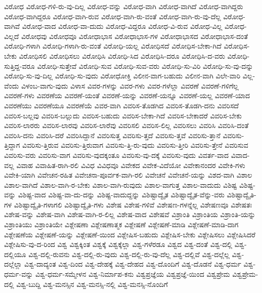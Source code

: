 {ವಿರೋಧ
ವಿರೋಧ-ಗಳಿ-ರು-ವು-ದಿಲ್ಲ
ವಿರೋಧ-ವನ್ನು
ವಿರೋಧ-ವಾಗಿ
ವಿರೋಧ-ವಾಗಿದೆ
ವಿರೋಧ-ವಾಗಿದ್ದರು
ವಿರೋಧ-ವಾಗಿದ್ದರೂ
ವಿರೋಧ-ವಾಗಿ-ರುವ
ವಿರೋಧ-ವಾಗಿ-ರು-ವಂತೆ
ವಿರೋಧ-ವಾಗಿ-ರು-ವು-ದೆಲ್ಲ
ವಿರೋಧ-ವಾಗಿವೆ
ವಿರೋಧ-ವಾದ
ವಿರೋಧ-ವಾ-ದುದು
ವಿರೋಧ-ವಿದ್ದರೂ
ವಿರೋಧ-ವಿ-ರುವ
ವಿರೋಧ-ವಿಲ್ಲ
ವಿರೋಧ-ವಿಲ್ಲದೆ
ವಿರೋಧವು
ವಿರೋಧವೂ
ವಿರೋಧಾಭಾಸ
ವಿರೋಧಾಭಾಸ-ಗಳ
ವಿರೋಧಾಭಾಸದ
ವಿರೋಧಾಭಾಸ-ದಂತೆ
ವಿರೋಧಿ-ಗಳಾಗಿ
ವಿರೋಧಿ-ಗಳಾಗಿ-ರು-ವಂತೆ
ವಿರೋಧಿ-ಯಲ್ಲ
ವಿರೋಧಿಸದೆ
ವಿರೋಧಿಸ-ಬೇಕಾ-ಗಿದೆ
ವಿರೋಧಿಸ-ಬೇಕು
ವಿರೋಧಿಸಲಿ
ವಿರೋಧಿಸಲು
ವಿರೋಧಿಸಿ
ವಿರೋಧಿ-ಸಿದ
ವಿರೋಧಿಸಿ-ದರೂ
ವಿರೋಧಿಸಿ-ದ-ವರು
ವಿರೋಧಿ-ಸುತ್ತಿದ್ದ-ವರೂ
ವಿರೋಧಿ-ಸುತ್ತೇವೆ
ವಿರೋಧಿ-ಸುವ
ವಿರೋಧಿ-ಸುವ-ವರು
ವಿರೋಧಿ-ಸು-ವಿರಿ
ವಿರೋಧಿ-ಸು-ವು-ದನ್ನು
ವಿರೋಧಿ-ಸು-ವು-ದಿಲ್ಲ
ವಿರೋಧಿ-ಸು-ವುದು
ವಿರೋಧೋಕ್ತಿ
ವಿಲೀನ-ವಾಗ-ಬಹುದು
ವಿಲೀನ-ವಾಗಿ
ವಿಲೇ-ವಾರಿ
ವಿಲ್ಲ-ವೆಂದು
ವಿಳಂಬ-ವಾಗು-ವುದು
ವಿಳಾಸ
ವಿವರ-ಗಳನ್ನು
ವಿವರ-ಗಳು
ವಿವರ-ಗಳೆಲ್ಲಾ
ವಿವರಣೆ
ವಿವರಣೆ-ಗಳಿಗೆಲ್ಲ
ವಿವರಣೆ-ಗಳು
ವಿವರಣೆಯ
ವಿವರಣೆ-ಯಂತೆ
ವಿವರಣೆ-ಯನ್ನು
ವಿವರಣೆ-ಯನ್ನೂ
ವಿವರಣೆ-ಯಲ್ಲ
ವಿವರಣೆ-ಯಾದ
ವಿವರಣೆಯು
ವಿವರಣೆಯೂ
ವಿವರಣೆಯೆ
ವಿವರ-ವಾಗಿ
ವಿವರಿಸ-ತೊಡಗಿದ
ವಿವರಿಸ-ತೊಡಗಿ-ದನು
ವಿವರಿಸದೆ
ವಿವರಿಸ-ಬಲ್ಲವು
ವಿವರಿಸ-ಬಲ್ಲುದು
ವಿವರಿಸ-ಬಹುದು
ವಿವರಿಸ-ಬೇಕಾ-ಗಿದೆ
ವಿವರಿಸ-ಬೇಕಾದರೆ
ವಿವರಿಸ-ಬೇಕು
ವಿವರಿಸ-ಲಾರರು
ವಿವರಿಸ-ಲಾರವು
ವಿವರಿಸ-ಲಾರೆವು
ವಿವರಿಸಲಿ
ವಿವರಿಸ-ಲಿಲ್ಲ
ವಿವರಿಸಲು
ವಿವರಿಸಿ
ವಿವರಿಸಿ-ದಂತೆ
ವಿವರಿಸಿ-ದನು
ವಿವರಿಸಿ-ದರೆ
ವಿವರಿಸಿದ್ದಾನೆ
ವಿವರಿಸುತ್ತ
ವಿವರಿಸು-ತ್ತದೆ
ವಿವರಿಸು-ತ್ತವೆ
ವಿವರಿಸು-ತ್ತಾನೆ
ವಿವರಿಸು-ತ್ತಿದ್ದಾಗ
ವಿವರಿಸು-ತ್ತಿರುವ
ವಿವರಿಸು-ತ್ತಿರುವಾಗ
ವಿವರಿಸು-ತ್ತಿ-ರು-ವುದು
ವಿವರಿಸು-ತ್ತೀರಿ
ವಿವರಿಸು-ತ್ತೇನೆ
ವಿವರಿಸುವ
ವಿವರಿಸು-ವರು
ವಿವರಿಸು-ವಾಗ
ವಿವರಿಸು-ವುದಕ್ಕಂತೂ
ವಿವರಿಸು-ವು-ದಕ್ಕೆ
ವಿವರಿಸು-ವುದು
ವಿವರ್ತ-ವಾದ
ವಿವಾದ-ವಲ್ಲ
ವಿವಾಹ
ವಿವಾಹಿತ-ರಾಗಿ-ರಲಿ
ವಿವಿಧ
ವಿವಿಧವೂ
ವಿವೇಕದ
ವಿವೇಕ-ವಿದೆಯೋ
ವಿವೇಕಾನಂದರ
ವಿವೇಕಿ-ಗಳು
ವಿವೇಕಿ-ಯಾಗಿ
ವಿವೇಚನ-ರಹಿತ
ವಿವೇಚನಾ-ಪೂರ್ವಕ-ವಾಗಿ-ರಲಿ
ವಿವೇಚನೆ
ವಿವೇಚನೆ-ಯನ್ನು
ವಿಶದ-ವಾಗಿ
ವಿಶಾಲ
ವಿಶಾಲ-ವಾಗಿದೆ
ವಿಶಾಲ-ವಾಗಿ-ರ-ಬೇಕು
ವಿಶಾಲ-ವಾಗಿ-ರುವುದು
ವಿಶಾಲ-ವಾಗುತ್ತ
ವಿಶಾಲ-ವಾದುದು
ವಿಶಿಷ್ಟ
ವಿಶಿಷ್ಟ-ವನ್ನು
ವಿಶಿಷ್ಟ-ವಾದ
ವಿಶಿಷ್ಟ-ವಾ-ದು-ದನ್ನು
ವಿಶಿಷ್ಟ-ವಾದುದ್ದನ್ನು
ವಿಶಿಷ್ಟಾದ್ವೈತ
ವಿಶಿಷ್ಟಾದ್ವೈತ-ವೆನ್ನು-ವರು
ವಿಶಿಷ್ಟಾದ್ವೈತಿ-ಗಳ
ವಿಶಿಷ್ಟಾದ್ವೈತಿ-ಗಳಾಗಲಿ
ವಿಶಿಷ್ಟಾದ್ವೈತಿ-ಗಳು
ವಿಶೇಷ
ವಿಶೇಷ-ಗಳಿವೆ
ವಿಶೇಷಣ-ಗಳನ್ನೆಲ್ಲ
ವಿಶೇಷಣವೂ
ವಿಶೇಷತಃ
ವಿಶೇಷ-ವನ್ನು
ವಿಶೇಷ-ವಾಗಿ
ವಿಶೇಷ-ವಾಗಿ-ರ-ಲಿಲ್ಲ
ವಿಶೇಷ-ವಾದ
ವಿಶೇಷವೆ
ವಿಶ್ರಾಂತಿ
ವಿಶ್ರಾಂತಿಯ
ವಿಶ್ರಾಂತಿ-ಯನ್ನು
ವಿಶ್ರಾಂತಿಯು
ವಿಶ್ರಾಂತಿಯೇ
ವಿಶ್ಲೇಷಣಾ
ವಿಶ್ಲೇಷಣಾತ್ಮಕ
ವಿಶ್ಲೇಷಣೆ
ವಿಶ್ಲೇಷಣೆ-ಮಾಡಿ
ವಿಶ್ಲೇಷಣೆ-ಮಾಡಿ-ದಾಗ
ವಿಶ್ಲೇಷಣೆಯ
ವಿಶ್ಲೇಷಣೆ-ಯನ್ನು
ವಿಶ್ಲೇಷಣೆ-ಯಿಂದ
ವಿಶ್ಲೇಷಿಸ-ಬಹುದು
ವಿಶ್ಲೇಷಿಸ-ಬೇಕು
ವಿಶ್ಲೇಷಿಸಲು
ವಿಶ್ಲೇಷಿಸಿದರೆ
ವಿಶ್ಲೇಷಿಸು-ವು-ದ-ರಿಂದ
ವಿಶ್ವ
ವಿಶ್ವಕ್ಕಿಂತ
ವಿಶ್ವಕ್ಕೆ
ವಿಶ್ವಕ್ಕೆಲ್ಲಾ
ವಿಶ್ವ-ಗಳೆರಡೂ
ವಿಶ್ವದ
ವಿಶ್ವ-ದಂತೆ
ವಿಶ್ವ-ದಲ್ಲಿ
ವಿಶ್ವ-ದಲ್ಲಿಯೂ
ವಿಶ್ವ-ದಲ್ಲಿ-ರುವನು
ವಿಶ್ವ-ದಲ್ಲಿ-ರು-ವುದು
ವಿಶ್ವ-ದಲ್ಲಿ-ರು-ವು-ದೆಲ್ಲ
ವಿಶ್ವ-ದಲ್ಲಿವೆ
ವಿಶ್ವ-ದಲ್ಲೆಲ್ಲ
ವಿಶ್ವ-ದಲ್ಲೆಲ್ಲಾ
ವಿಶ್ವ-ದಾದ್ಯಂತ
ವಿಶ್ವ-ದಿಂದ
ವಿಶ್ವ-ದೇಹಕ್ಕೆ
ವಿಶ್ವ-ದೇಹದ
ವಿಶ್ವ-ದೊಂದಿಗೆ
ವಿಶ್ವ-ದೊಡನೆ
ವಿಶ್ವ-ಧರ್ಮ
ವಿಶ್ವ-ಧರ್ಮ-ವನ್ನು
ವಿಶ್ವ-ಧರ್ಮ-ಸಮ್ಮೇಳನ
ವಿಶ್ವ-ನಿರ್ಮಾಪ-ಕನು
ವಿಶ್ವಪ್ರಜ್ಞೆಯ
ವಿಶ್ವಪ್ರಜ್ಞೆ-ಯಿಂದ
ವಿಶ್ವಪ್ರೇಮ
ವಿಶ್ವಪ್ರೇಮ-ದಲ್ಲಿ
ವಿಶ್ವ-ಬುದ್ದಿ
ವಿಶ್ವ-ಮನಸ್ಸಿನ
ವಿಶ್ವ-ಮನಸ್ಸಿ-ನಲ್ಲಿ
ವಿಶ್ವ-ಮನಸ್ಸಿ-ನೊಂದಿಗೆ
}

